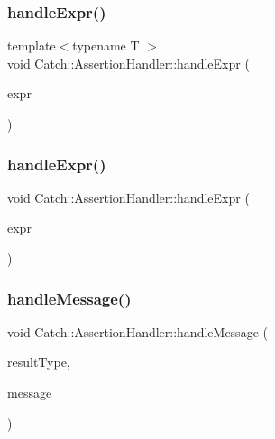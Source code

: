 \mbox{\label{class_catch_1_1_assertion_handler_a2ef387e567bad90ec6e4b5bf5c367388}} 
\subsubsection{handleExpr()\hspace{0.1cm}{\footnotesize\ttfamily [1/2]}}
{\footnotesize\ttfamily template$<$typename T $>$ \\
void Catch\+::\+Assertion\+Handler\+::handle\+Expr (\begin{DoxyParamCaption}\item[{\textbf{ Expr\+Lhs}$<$ T $>$ const \&}]{expr }\end{DoxyParamCaption})\hspace{0.3cm}{\ttfamily [inline]}}

\mbox{\label{class_catch_1_1_assertion_handler_afe14d9cf1b1c7f70dae439fbdb51d0c4}} 
\subsubsection{handleExpr()\hspace{0.1cm}{\footnotesize\ttfamily [2/2]}}
{\footnotesize\ttfamily void Catch\+::\+Assertion\+Handler\+::handle\+Expr (\begin{DoxyParamCaption}\item[{\textbf{ I\+Transient\+Expression} const \&}]{expr }\end{DoxyParamCaption})}

\mbox{\label{class_catch_1_1_assertion_handler_abdb4c180ed83ec2858b2fb87712c516d}} 
\subsubsection{handleMessage()}
{\footnotesize\ttfamily void Catch\+::\+Assertion\+Handler\+::handle\+Message (\begin{DoxyParamCaption}\item[{\textbf{ Result\+Was\+::\+Of\+Type}}]{result\+Type,  }\item[{\textbf{ String\+Ref} const \&}]{message }\end{DoxyParamCaption})}

